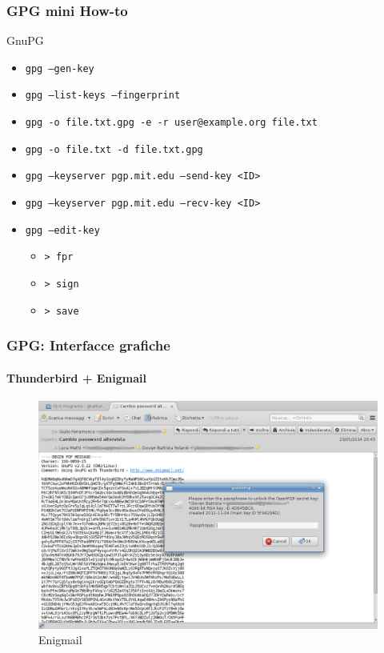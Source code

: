 \documentclass{beamer}
\begin{document}
\begin{frame}[fragile]
  \frametitle{GPG mini How-to}

  \begin{block}{GnuPG}
    \begin{itemize}[<+->]
      \item \tt gpg --gen-key
      \item \tt gpg --list-keys --fingerprint
      \item \tt gpg -o file.txt.gpg -e -r user@example.org file.txt
      \item \tt gpg -o file.txt -d file.txt.gpg
      \item \tt gpg --keyserver pgp.mit.edu --send-key <ID>
      \item \tt gpg --keyserver pgp.mit.edu --recv-key <ID>
      \item \tt gpg --edit-key
      \begin{itemize}
        \item \tt > fpr
        \item \tt > sign
        \item \tt > save
      \end{itemize}
    \end{itemize}
  \end{block}
\end{frame}

\begin{frame}
  \frametitle{GPG: Interfacce grafiche}
  \framesubtitle{Thunderbird + Enigmail}

  \begin{figure}
    \centering
    \includegraphics[width=.7\linewidth]{enigmail.png}
    \caption{Enigmail}
    \label{fig:enigmail0}
  \end{figure}
\end{frame}
\end{document}
